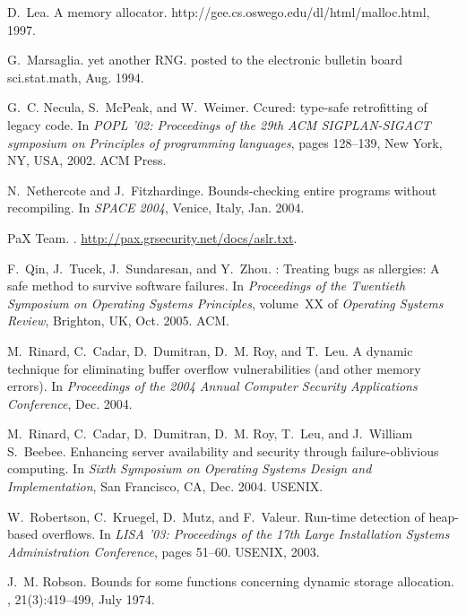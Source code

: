 \documentclass{sig-alternate}
\begin{document}
\begin{thebibliography}{10}
D.~Lea.
\newblock A memory allocator.
\newblock http://gee.cs.oswego.edu/dl/html/malloc.html, 1997.

G.~Marsaglia.
\newblock yet another {RNG}.
\newblock posted to the electronic bulletin board sci.stat.math, Aug. 1994.

G.~C. Necula, S.~McPeak, and W.~Weimer.
\newblock Ccured: type-safe retrofitting of legacy code.
\newblock In {\em POPL '02: Proceedings of the 29th ACM SIGPLAN-SIGACT
  symposium on Principles of programming languages}, pages 128--139, New York,
  NY, USA, 2002. ACM Press.

N.~Nethercote and J.~Fitzhardinge.
\newblock Bounds-checking entire programs without recompiling.
\newblock In {\em SPACE 2004}, Venice, Italy, Jan. 2004.

{PaX Team}.
.
\newblock \url{http://pax.grsecurity.net/docs/aslr.txt}.

F.~Qin, J.~Tucek, J.~Sundaresan, and Y.~Zhou.
: Treating bugs as allergies: A safe method to survive software
  failures.
\newblock In {\em Proceedings of the Twentieth Symposium on Operating Systems
  Principles}, volume~XX of {\em Operating Systems Review}, Brighton, UK, Oct.
  2005. ACM.

M.~Rinard, C.~Cadar, D.~Dumitran, D.~M. Roy, and T.~Leu.
\newblock A dynamic technique for eliminating buffer overflow vulnerabilities
  (and other memory errors).
\newblock In {\em Proceedings of the 2004 Annual Computer Security Applications
  Conference}, Dec. 2004.

M.~Rinard, C.~Cadar, D.~Dumitran, D.~M. Roy, T.~Leu, and J.~William S.~Beebee.
\newblock Enhancing server availability and security through failure-oblivious
  computing.
\newblock In {\em Sixth Symposium on Operating Systems Design and
  Implementation}, San Francisco, CA, Dec. 2004. USENIX.

W.~Robertson, C.~Kruegel, D.~Mutz, and F.~Valeur.
\newblock Run-time detection of heap-based overflows.
\newblock In {\em LISA '03: Proceedings of the 17th Large Installation Systems
  Administration Conference}, pages 51--60. USENIX, 2003.

J.~M. Robson.
\newblock Bounds for some functions concerning dynamic storage allocation.
, 21(3):419--499, July 1974.


\end{thebibliography}
\end{document}
